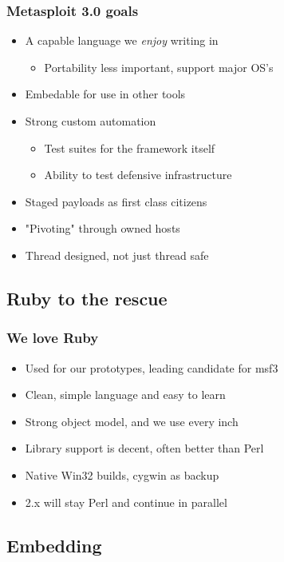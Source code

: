 \documentclass{beamer}
\newenvironment{sitemize}{\vspace{1mm}\begin{itemize}\itemsep 4pt\small}{\end{itemize}}
\begin{document}
\begin{frame}[t]
  \frametitle{Metasploit 3.0 goals}
  
  \begin{sitemize}
    \item A capable language we \emph{enjoy} writing in
    \begin{sitemize}
      \item Portability less important, support major OS's
    \end{sitemize}
    \pause
    \item Embedable for use in other tools
    \pause
    \item Strong custom automation
    \begin{sitemize}
      \item Test suites for the framework itself
      \item Ability to test defensive infrastructure
    \end{sitemize}
    \pause
    \item Staged payloads as first class citizens
    \pause
    \item "Pivoting" through owned hosts
    \pause
    \item Thread designed, not just thread safe
  \end{sitemize}
\end{frame}

\subsection{Ruby to the rescue}

\begin{frame}[t]
  \frametitle{We love Ruby}
  \begin{sitemize}
    \item Used for our prototypes, leading candidate for msf3
    \item Clean, simple language and easy to learn
    \item Strong object model, and we use every inch
    \pause
    \item Library support is decent, often better than Perl
    \item Native Win32 builds, cygwin as backup
    \item 2.x will stay Perl and continue in parallel
  \end{sitemize}
\end{frame}

\subsection{Embedding}
\end{document}
